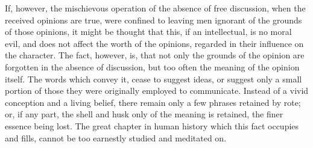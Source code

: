 \documentclass[12pt]{report}
\begin{document}
If, however, the mischievous operation of the absence of free discussion, when the received opinions are true, were confined to leaving men ignorant of the grounds of those opinions, it might be thought that this, if an intellectual, is no moral evil, and does not affect the worth of the opinions, regarded in their influence on the character. The fact, however, is, that not only the grounds of the opinion are forgotten in the absence of discussion, but too often the meaning of the opinion itself. The words which convey it, cease to suggest ideas, or suggest only a small portion of those they were originally employed to communicate. Instead of a vivid conception and a living belief, there remain only a few phrases retained by rote; or, if any part, the shell and husk only of the meaning is retained, the finer essence being lost. The great chapter in human history which this fact occupies and fills, cannot be too earnestly studied and meditated on.
\end{document}
